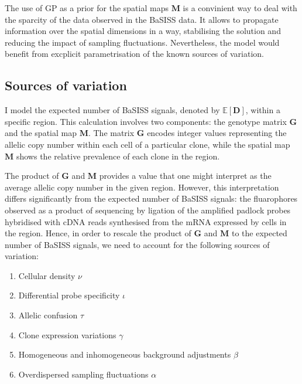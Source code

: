 The use of \ac{GP} as a prior for the spatial maps $\mathbf{M}$ is a convinient way to deal with the sparcity of the data observed in the \ac{BaSISS} data. It allows to propagate information over the spatial dimensions in a  way, stabilising the solution and reducing the impact of sampling fluctuations. Nevertheless, the model would benefit from excplicit parametrisation of the known sources of variation.

\subsection{Sources of variation}

I model the expected number of \ac{BaSISS} signals, denoted by $\mathbb{E}[\mathbf{D}]$, within a specific region. This calculation involves two components: the genotype matrix $\mathbf{G}$ and the spatial map $\mathbf{M}$. The matrix $\mathbf{G}$ encodes integer values representing the allelic copy number within each cell of a particular clone, while the spatial map $\mathbf{M}$ shows the relative prevalence of each clone in the region.

The product of $\mathbf{G}$ and $\mathbf{M}$ provides a value that one might interpret as the average allelic copy number in the given region. However, this interpretation differs significantly from the expected number of BaSISS signals: the fluarophores observed as a product of sequencing by ligation of the amplified padlock probes hybridised with cDNA reads synthesised from the mRNA expressed by cells in the region. Hence, in order to rescale the product of $\mathbf{G}$ and $\mathbf{M}$ to the expected number of BaSISS signals, we need to account for the following sources of variation:

\begin{enumerate}
    \item Cellular density $\nu$
    \item Differential probe specificity $\iota$
    \item Allelic confusion $\tau$
    \item Clone expression variations $\gamma$
    \item Homogeneous and inhomogeneous background adjustments $\beta$
    \item Overdispersed sampling fluctuations $\alpha$
\end{enumerate}

